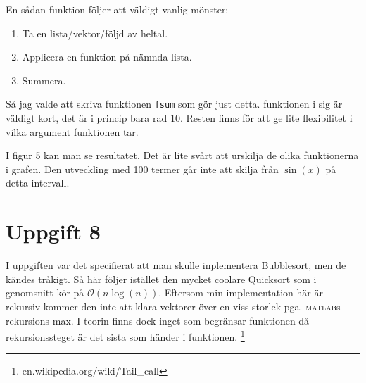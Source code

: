 \documentclass[a4paper,11pt]{article}
\begin{document}
    \noindent
    En sådan funktion följer att väldigt vanlig mönster:
    \begin{enumerate}
        \item Ta en lista/vektor/följd av heltal.
        \item Applicera en funktion på nämnda lista.
        \item Summera.
    \end{enumerate}
    Så jag valde att skriva funktionen \verb+fsum+ som gör just detta.
    funktionen i sig är väldigt kort, det är i princip bara rad 10. Resten finns
    för att ge lite flexibilitet i vilka argument funktionen tar.
    \begin{samepage}
    \end{samepage}
    I figur 5 kan man se resultatet. Det är lite svårt att urskilja de olika
    funktionerna i grafen. Den utveckling med 100 termer går inte att skilja
    från $\sin (x)$ på detta intervall.
    \begin{samepage}
    \end{samepage}

    \pagebreak[2]
    \section*{Uppgift 8}
    I uppgiften var det specifierat att man skulle inplementera Bubblesort,
    men de kändes tråkigt. Så här följer istället den mycket coolare Quicksort
     som i genomsnitt kör på
    $\mathcal{O}(n \log(n))$.
    Eftersom min implementation här är rekursiv kommer den inte att klara
    vektorer över en viss storlek pga. \textsc{matlab}s rekursions-max.
    I teorin finns dock inget som begränsar funktionen då rekursionssteget
    är det sista som händer i funktionen.
    \footnote{en.wikipedia.org/wiki/Tail\_call}
    \begin{samepage}
    \end{samepage}
\end{document}
